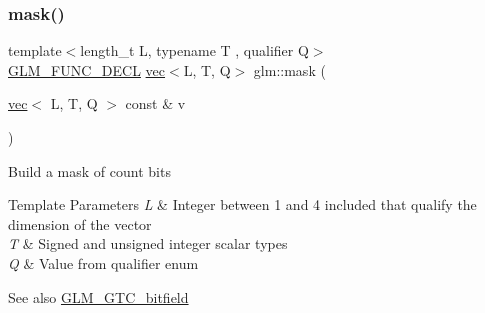 \subsubsection{\texorpdfstring{mask()}{mask()}\hspace{0.1cm}{\footnotesize\ttfamily [2/2]}}
{\footnotesize\ttfamily template$<$length\+\_\+t L, typename T , qualifier Q$>$ \\
\hyperlink{setup_8hpp_ab2d052de21a70539923e9bcbf6e83a51}{G\+L\+M\+\_\+\+F\+U\+N\+C\+\_\+\+D\+E\+CL} \hyperlink{structglm_1_1vec}{vec}$<$L, T, Q$>$ glm\+::mask (\begin{DoxyParamCaption}\item[{\hyperlink{structglm_1_1vec}{vec}$<$ L, T, Q $>$ const \&}]{v }\end{DoxyParamCaption})}

Build a mask of \textquotesingle{}count\textquotesingle{} bits


\begin{DoxyTemplParams}{Template Parameters}
{\em L} & Integer between 1 and 4 included that qualify the dimension of the vector \\
\hline
{\em T} & Signed and unsigned integer scalar types \\
\hline
{\em Q} & Value from qualifier enum\\
\hline
\end{DoxyTemplParams}
\begin{DoxySeeAlso}{See also}
\hyperlink{group__gtc__bitfield}{G\+L\+M\+\_\+\+G\+T\+C\+\_\+bitfield} 
\end{DoxySeeAlso}
